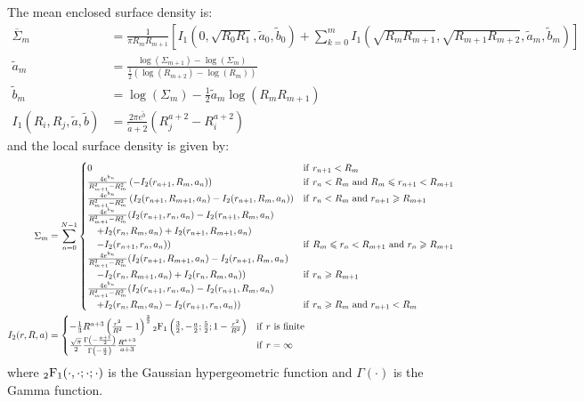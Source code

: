 \documentclass[usenatbib]{mnras}
\begin{document}
The mean enclosed surface density is:
\begin{align}
  \overline{\Sigma}_m &= \frac{1}{\pi R_mR_{m+1}}\left[I_1(0, \sqrt{R_0R_1}, \tilde{a}_0, \tilde{b}_0) + 
\sum_{k=0}^m I_1(\sqrt{R_mR_{m+1}},\sqrt{R_{m+1}R_{m+2}}, \tilde{a}_m, \tilde{b}_m)\right]\\
  \tilde{a}_m &= \frac{\log(\Sigma_{m+1})-\log(\Sigma_m)}{\frac{1}{2}\left(\log(R_{m+2})-\log(R_m)\right)}\\
  \tilde{b}_m &= \log(\Sigma_m) - \frac{1}{2}\tilde{a}_m\log(R_mR_{m+1})\\
  I_1(R_i,R_j,\tilde{a},\tilde{b}) &= \frac{2\pi e^{\tilde{b}}}{\tilde{a}+2}\left(R_j^{a+2} - R_i^{a+2}\right)
\end{align}
\noindent and the local surface density is given by:
\begin{align}
  \Sigma_m &= \sum_{n=0}^{N-1}
  \begin{cases}
    0 & {\rm if}\ r_{n+1} < R_m\\
    \frac{4e^{b_n}}{R_{m+1}^2-R_m^2} \left(-I_2(r_{n+1},R_m,a_n)\right) & {\rm if}\ r_n < R_m\ {\rm and}\ R_m \leq r_{n+1} < R_{m+1}\\
    \frac{4e^{b_n}}{R_{m+1}^2-R_m^2} \left(I_2(r_{n+1},R_{m+1},a_n)-I_2(r_{n+1},R_m,a_n)\right) & {\rm if}\ r_n < R_m\ {\rm and}\ r_{n+1} \geq R_{m+1}\\
    \frac{4e^{b_n}}{R_{m+1}^2-R_m^2} (I_2(r_{n+1},r_n,a_n)-I_2(r_{n+1},R_m,a_n)\\ \quad +I_2(r_n,R_m,a_n)+I_2(r_{n+1},R_{m+1},a_n)\\ \quad -I_2(r_{n+1},r_n,a_n)) & {\rm if}\ R_m \leq r_n < R_{m+1}\ {\rm and}\ r_n \geq R_{m+1}\\
    \frac{4e^{b_n}}{R_{m+1}^2-R_m^2} (I_2(r_{n+1},R_{m+1},a_n)-I_2(r_{n+1},R_m,a_n)\\ \quad -I_2(r_n,R_{m+1},a_n)+I_2(r_n,R_m,a_n)) & {\rm if}\ r_n \geq R_{m+1}\\
    \frac{4e^{b_n}}{R_{m+1}^2-R_m^2} (I_2(r_{n+1},r_n,a_n)-I_2(r_{n+1},R_m,a_n)\\ \quad +I_2(r_n,R_m,a_n)-I_2(r_{n+1},r_n,a_n)) & {\rm if}\ r_n \geq R_m\ {\rm and}\ r_{n+1} < R_m\\
  \end{cases}\\
  I_2(r,R,a) &=
  \begin{cases}
    -\frac{1}{3}R^{a+3}\left(\frac{r^2}{R^2}-1\right)^{\frac{3}{2}}{}_2{\rm F}_1\left(\frac{3}{2},-\frac{a}{2};\frac{5}{2};1-\frac{r^2}{R^2}\right) & {\rm if}\ r\ {\rm is}\ {\rm finite}\\
    \frac{\sqrt{\pi}}{2}\frac{\Gamma\left(-\frac{a+1}{2}\right)}{\Gamma\left(-\frac{a}{2}\right)}\frac{R^{a+3}}{a+3} & {\rm if}\ r=\infty
  \end{cases}
\end{align}
where ${}_2{\rm F}_1(\cdot,\cdot;\cdot;\cdot)$ is the Gaussian hypergeometric function and $\Gamma(\cdot)$ is the Gamma function.

\bsp	%
\label{lastpage}
\end{document}
